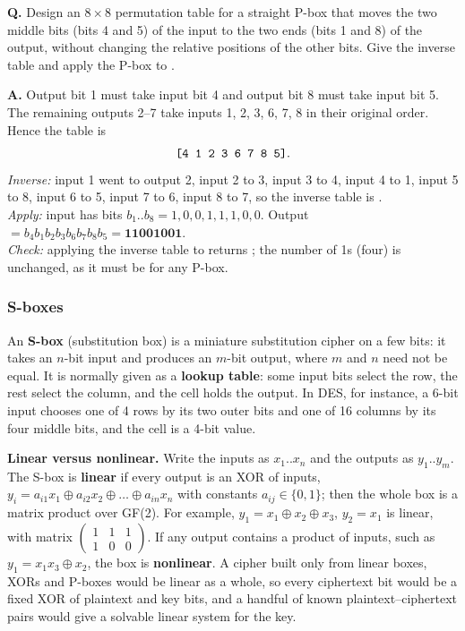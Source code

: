\begin{worked}
\textbf{Q.} Design an $8 \times 8$ permutation table for a straight P-box that moves the two middle bits (bits 4 and 5) of the input to the two ends (bits 1 and 8) of the output, without changing the relative positions of the other bits. Give the inverse table and apply the P-box to .

\textbf{A.} Output bit 1 must take input bit 4 and output bit 8 must take input bit 5. The remaining outputs 2--7 take inputs 1, 2, 3, 6, 7, 8 in their original order. Hence the table is
\[
\text{\texttt{[4 1 2 3 6 7 8 5]}}.
\]
\emph{Inverse:} input 1 went to output 2, input 2 to 3, input 3 to 4, input 4 to 1, input 5 to 8, input 6 to 5, input 7 to 6, input 8 to 7, so the inverse table is \ttx{[2 3 4 1 8 5 6 7]}.\\
\emph{Apply:} input  has bits $b_1..b_8 = 1,0,0,1,1,1,0,0$. Output $= b_4 b_1 b_2 b_3 b_6 b_7 b_8 b_5 = \mathbf{11001001}$.\\
\emph{Check:} applying the inverse table to  returns ; the number of 1s (four) is unchanged, as it must be for any P-box.
\end{worked}

\subsubsection*{S-boxes}
An \textbf{S-box} (substitution box) is a miniature substitution cipher on a few bits: it takes an $n$-bit input and produces an $m$-bit output, where $m$ and $n$ need not be equal. It is normally given as a \textbf{lookup table}: some input bits select the row, the rest select the column, and the cell holds the output. In DES, for instance, a 6-bit input chooses one of 4 rows by its two outer bits and one of 16 columns by its four middle bits, and the cell is a 4-bit value.

\textbf{Linear versus nonlinear.} Write the inputs as $x_1..x_n$ and the outputs as $y_1..y_m$. The S-box is \textbf{linear} if every output is an XOR of inputs, $y_i = a_{i1}x_1 \oplus a_{i2}x_2 \oplus \dots \oplus a_{in}x_n$ with constants $a_{ij} \in \{0,1\}$; then the whole box is a matrix product over GF(2). For example, $y_1 = x_1 \oplus x_2 \oplus x_3$, $y_2 = x_1$ is linear, with matrix $\left(\begin{smallmatrix}1&1&1\\1&0&0\end{smallmatrix}\right)$. If any output contains a product of inputs, such as $y_1 = x_1 x_3 \oplus x_2$, the box is \textbf{nonlinear}. A cipher built only from linear boxes, XORs and P-boxes would be linear as a whole, so every ciphertext bit would be a fixed XOR of plaintext and key bits, and a handful of known plaintext--ciphertext pairs would give a solvable linear system for the key. 

